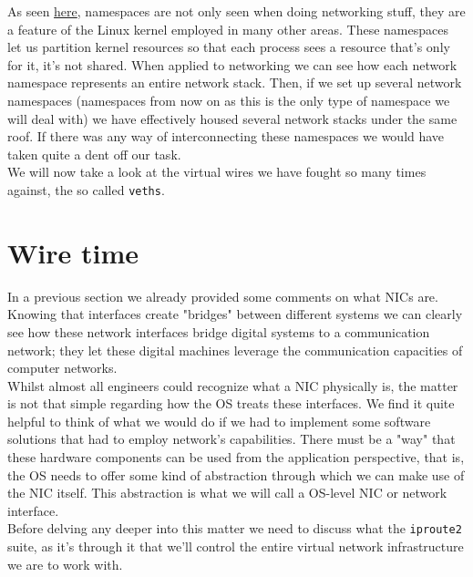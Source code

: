         As seen \href{https://en.wikipedia.org/wiki/Linux_namespaces}{here}, namespaces are not only seen when doing networking stuff, they are a feature of the Linux kernel employed in many other areas. These namespaces let us partition kernel resources so that each process sees a resource that's only for it, it's not shared. When applied to networking we can see how each network namespace represents an entire network stack. Then, if we set up several network namespaces (namespaces from now on as this is the only type of namespace we will deal with) we have effectively housed several network stacks under the same roof. If there was any way of interconnecting these namespaces we would have taken quite a dent off our task.\\

        We will now take a look at the virtual wires we have fought so many times against, the so called \texttt{veths}.\\

    \section{Wire time}
        In a previous section we already provided some comments on what NICs are. Knowing that interfaces create "bridges" between different systems we can clearly see how these network interfaces bridge digital systems to a communication network; they let these digital machines leverage the communication capacities of computer networks.\\

        Whilst almost all engineers could recognize what a NIC physically is, the matter is not that simple regarding how the OS treats these interfaces. We find it quite helpful to think of what we would do if we had to implement some software solutions that had to employ network's capabilities. There must be a "way" that these hardware components can be used from the application perspective, that is, the OS needs to offer some kind of abstraction through which we can make use of the NIC itself. This abstraction is what we will call a OS-level NIC or network interface.\\

        Before delving any deeper into this matter we need to discuss what the \texttt{iproute2} suite, as it's through it that we'll control the entire virtual network infrastructure we are to work with.


